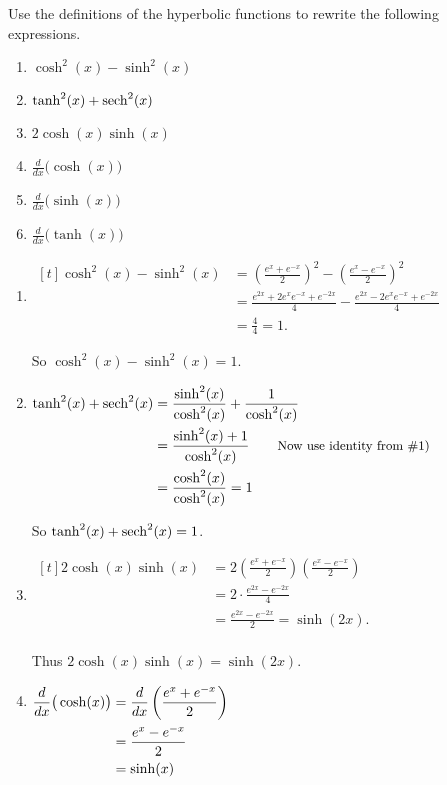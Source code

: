 
\begin{example} \label{eg:6.8.1} %
Use the definitions of the hyperbolic functions to rewrite the following expressions.
\bmtwo
\begin{enumerate}[1)]
\item	 $\cosh^2 (x)-\sinh^2(x)$
\item	 $\tanh^2 (x)+\operatorname{sech}^2 (x)$
\item	 $2\cosh (x)\sinh (x)$
\item	 $\frac{d}{dx}\big(\cosh (x)\big)$
\item	 $\frac{d}{dx}\big(\sinh (x)\big)$
\item	 $\frac{d}{dx}\big(\tanh (x)\big)$
\end{enumerate}
\emtwo

\solution
\begin{enumerate}[1)]
\item	 $\begin{aligned}[t]
 \cosh^2(x)-\sinh^2(x) &= \left(\frac{e^x+e^{-x}}2\right)^2 -\left(\frac{e^x-e^{-x}}2\right)^2\\
 						&= \frac{e^{2x}+2e^xe^{-x} + e^{-2x}}4 - \frac{e^{2x}-2e^xe^{-x} + e^{-2x}}4\\
 						&= \frac44=1.
\end{aligned}$\hfill

So $\cosh^2 (x)-\sinh^2(x)=1$.

\item	 $\begin{aligned}[t]
\tanh^2 (x)+\operatorname{sech}^2 (x) &=\frac{\sinh^2(x)}{\cosh^2 (x)} + \frac{1}{\cosh^2 (x)} \\
&= \frac{\sinh^2(x)+1}{\cosh^2 (x)}\qquad \text{\small Now use identity from \#1)}\\
&= \frac{\cosh^2 (x)}{\cosh^2 (x)} = 1
\end{aligned}$\hfill

So $\tanh^2 (x)+\operatorname{sech}^2 (x)=1$.

\item $\begin{aligned}[t]
2\cosh (x)\sinh (x) &= 2\left(\frac{e^x+e^{-x}}2\right)\left(\frac{e^x-e^{-x}}2\right) \\
&= 2 \cdot\frac{e^{2x} - e^{-2x}}4\\
&= \frac{e^{2x} - e^{-2x}}2 = \sinh (2x).\\
\end{aligned}$ \hfill
			
Thus $2\cosh (x)\sinh (x) = \sinh (2x)$.

\item  $\begin{aligned}[t]
\frac{d}{dx}\big(\cosh (x)\big) &= \frac{d}{dx}\left(\frac{e^x+e^{-x}}2\right) \\
&= \frac{e^x-e^{-x}}2\\
&= \sinh (x)
\end{aligned}\hfill$


\end{enumerate}
\end{example}
